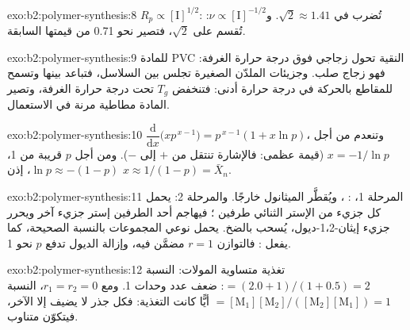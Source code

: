 \begin{solution}{exo:b2:polymer-synthesis:8}
$R_p \propto [\mathrm I]^{1/2}$: تُضرب في $\sqrt2 \approx 1.41$. و$\nu \propto [\mathrm I]^{-1/2}$:
تُقسم على $\sqrt 2$، فتصير نحو 0.71 من قيمتها السابقة.
\end{solution}

\begin{solution}{exo:b2:polymer-synthesis:9}
للمادة PVC النقية تحول زجاجي فوق درجة حرارة الغرفة: فهو زجاج صلب. وجزيئات الملدّن الصغيرة
تجلس بين السلاسل، فتباعد بينها وتسمح للمقاطع بالحركة في درجة حرارة أدنى: فتنخفض $T_g$
تحت درجة حرارة الغرفة، وتصير المادة مطاطية مرنة في الاستعمال.
\end{solution}

\begin{solution}{exo:b2:polymer-synthesis:10}
$\dfrac{\mathrm d}{\mathrm dx}\bigl(x p^{\,x-1}\bigr) = p^{\,x-1}(1 + x\ln p)$، وتنعدم من أجل $x = -1/\ln p$
(قيمة عظمى: فالإشارة تنتقل من $+$ إلى $-$). ومن أجل $p$ قريبة من 1، $\ln p \approx -(1-p)$، إذن $x \approx
1/(1-p) = \bar X_n$.
\end{solution}

\begin{solution}{exo:b2:polymer-synthesis:11}
المرحلة 1، : ، ويُقطَّر الميثانول
خارجًا. والمرحلة 2: يحمل كل جزيء من الإستر الثنائي طرفين ؛ فيهاجم أحد الطرفين إستر
جزيء آخر ويحرر جزيء إيثان-1،2-ديول، يُسحب بالضخ. 
يحمل نوعي المجموعات بالنسبة الصحيحة، كما يفعل  : فالتوازن $r = 1$
مضمَّن فيه، وإزالة الديول تدفع $p$ نحو 1.
\end{solution}

\begin{solution}{exo:b2:polymer-synthesis:12}
تغذية متساوية المولات: النسبة $= (2.0 + 1)/(1 + 0.5) = 2$: ضعف عدد وحدات  1. ومع $r_1 = r_2 =
0$، النسبة $= [\mathrm M_1][\mathrm M_2]/([\mathrm M_2][\mathrm M_1]) = 1$ أيًّا كانت التغذية: فكل
جذر لا يضيف إلا  الآخر، فيتكوّن  متناوب.
\end{solution}

